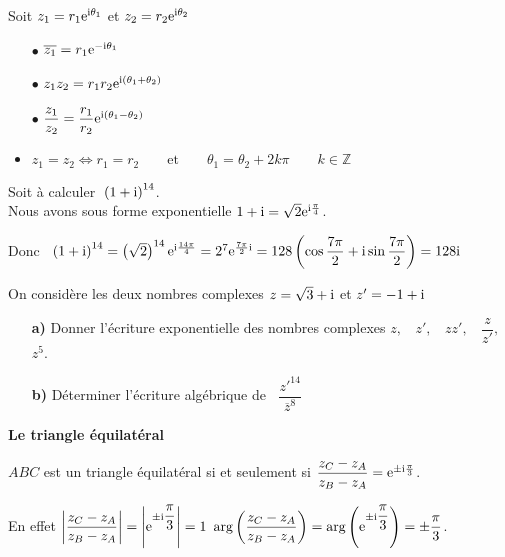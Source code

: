  \begin{property}
 Soit $ z_1= r_1\mathrm{e}^{\text{i}\theta_1} $ \; et \; $ z_2= r_2\mathrm{e}^{\text{i}\theta_2} $
 
 \begin{itemize}
 \item[$  \bullet$]  $ \overline{z_1}= r_1\mathrm{e}^{-\text{i}\theta_1}$
  \item[$  \bullet$]  $ z_1 z_2 =r_1r_2\mathrm{e}^{\text{i}(\theta_1+\theta_2)}$
   \item[$  \bullet$] $ \dfrac{z_1}{z_2} =\dfrac{r_1}{r_2}\mathrm{e}^{\text{i}(\theta_1-\theta_2)}$ 
 
 \medskip
 \item $ z_1= z_2 \Longleftrightarrow r_1= r_2 \qquad\text{et}\qquad \theta_1= \theta_2 +2k\pi\qquad   k\in\mathbb{Z}$
 \end{itemize}
  \end{property}
 \begin{example}
 Soit à calculer  $\; \left(1+\text{i}\right)^{14} $.\\ Nous avons sous forme exponentielle   
 $ 1+\text{i} =\sqrt{2}\mathrm{e}^{\text{i}\frac{\pi}{4}}$.
 
 
 \medskip
 
Donc  $\;\; \left(1+\text{i}\right)^{14}=\left( \sqrt{2}\right)^{14}\mathrm{e}^{\text{i}\frac{14\pi}{4}}=2^7\mathrm{e}^{\frac{7\pi}{2}\text{i}}=128\left(\cos \dfrac{7\pi}{2} +\text{i} \sin \dfrac{7\pi}{2}\right)=128\text{i}$
 \end{example}
 \begin{exercice}
 On considère les deux nombres complexes \; $ z=\sqrt{3} +\text{i} $\; et\; $ z'=-1+\text{i} $
 
 \begin{itemize}
 \item[\textbf{a)}] Donner l'écriture exponentielle des nombres complexes $ z,\;\; $ $ z',\;\; $ $ zz',\;\; $ $ \dfrac{z}{z'},\;\; $ $ z^5 $.
 \item[\textbf{b)}] Déterminer l'écriture algébrique  de $\;\; \dfrac{z'^{14}}{\overline{z}^8} $
 \end{itemize}
  \end{exercice}
 \bigskip
 
 \textbf{Le triangle équilatéral}

 $ ABC $ est un triangle équilatéral si et seulement si \; $ \dfrac{z_C-z_A}{z_B-z_A} =\mathrm{e}^{\pm\text{i}\frac{\pi}{3}}$.
 
 
 \medskip
 
 En effet $ \left\lvert \dfrac{z_C-z_A}{z_B-z_A}  \right\rvert=\left\lvert \mathrm{e}^{\pm\text{i}\dfrac{\pi}{3}} \right\rvert=1 $
 \qquad  $\text{arg}\left(\dfrac{z_C-z_A}{z_B-z_A}\right) =\text{arg}\left(\mathrm{e}^{\pm\text{i}\dfrac{\pi}{3}}\right)=\pm \dfrac{\pi}{3}$.
 
